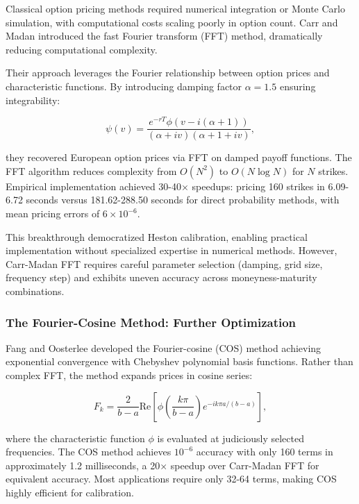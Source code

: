 \documentclass[12pt,a4paper]{article}
\begin{document}
Classical option pricing methods required numerical integration or Monte Carlo simulation, with computational costs scaling poorly in option count. Carr and Madan \cite{CarrMadan1999} introduced the fast Fourier transform (FFT) method, dramatically reducing computational complexity.

Their approach leverages the Fourier relationship between option prices and characteristic functions. By introducing damping factor $\alpha = 1.5$ ensuring integrability:

\begin{equation}
\psi(v) = \frac{e^{-rT} \phi(v - i(\alpha + 1))}{(\alpha + iv)(\alpha + 1 + iv)},
\end{equation}

they recovered European option prices via FFT on damped payoff functions. The FFT algorithm reduces complexity from $O(N^2)$ to $O(N \log N)$ for $N$ strikes. Empirical implementation achieved 30-40× speedups: pricing 160 strikes in 6.09-6.72 seconds versus 181.62-288.50 seconds for direct probability methods, with mean pricing errors of $6 \times 10^{-6}$.

This breakthrough democratized Heston calibration, enabling practical implementation without specialized expertise in numerical methods. However, Carr-Madan FFT requires careful parameter selection (damping, grid size, frequency step) and exhibits uneven accuracy across moneyness-maturity combinations.

\subsubsection{The Fourier-Cosine Method: Further Optimization}

Fang and Oosterlee \cite{FangOosterlee2009} developed the Fourier-cosine (COS) method achieving exponential convergence with Chebyshev polynomial basis functions. Rather than complex FFT, the method expands prices in cosine series:

\begin{equation}
F_k = \frac{2}{b-a} \text{Re}\left[\phi\left(\frac{k\pi}{b-a}\right) e^{-ik\pi a/(b-a)}\right],
\end{equation}

where the characteristic function $\phi$ is evaluated at judiciously selected frequencies. The COS method achieves $10^{-6}$ accuracy with only 160 terms in approximately 1.2 milliseconds, a 20× speedup over Carr-Madan FFT for equivalent accuracy. Most applications require only 32-64 terms, making COS highly efficient for calibration.
\end{document}
